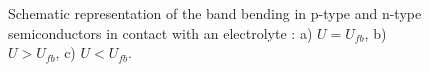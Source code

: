 \begin{figure}[H]
\centering

\caption{Schematic representation of the band bending in p-type and n-type 
semiconductors in contact with an electrolyte \citep{memming2008-1, bard2002-1}:
 a) $U = U_{fb}$, b) $U > U_{fb}$, c) $U < U_{fb}$.}
\label{fig_band_bending}

\end{figure}